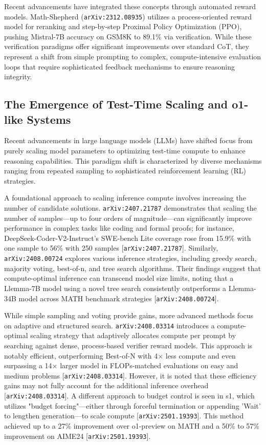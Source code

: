 \documentclass[11pt]{article}
\begin{document}
Recent advancements have integrated these concepts through automated reward models. Math-Shepherd (\texttt{arXiv:2312.08935}) utilizes a process-oriented reward model for reranking and step-by-step Proximal Policy Optimization (PPO), pushing Mistral-7B accuracy on GSM8K to 89.1\% via verification. While these verification paradigms offer significant improvements over standard CoT, they represent a shift from simple prompting to complex, compute-intensive evaluation loops that require sophisticated feedback mechanisms to ensure reasoning integrity.

\subsection{The Emergence of Test-Time Scaling and o1-like Systems}

Recent advancements in large language models (LLMs) have shifted focus from purely scaling model parameters to optimizing test-time compute to enhance reasoning capabilities. This paradigm shift is characterized by diverse mechanisms ranging from repeated sampling to sophisticated reinforcement learning (RL) strategies.

A foundational approach to scaling inference compute involves increasing the number of candidate solutions. \texttt{arXiv:2407.21787} demonstrates that scaling the number of samples—up to four orders of magnitude—can significantly improve performance in complex tasks like coding and formal proofs; for instance, DeepSeek-Coder-V2-Instruct's SWE-bench Lite coverage rose from 15.9\% with one sample to 56\% with 250 samples [\texttt{arXiv:2407.21787}]. Similarly, \texttt{arXiv:2408.00724} explores various inference strategies, including greedy search, majority voting, best-of-n, and tree search algorithms. Their findings suggest that compute-optimal inference can transcend model size limits, noting that a Llemma-7B model using a novel tree search consistently outperforms a Llemma-34B model across MATH benchmark strategies [\texttt{arXiv:2408.00724}].

While simple sampling and voting provide gains, more advanced methods focus on adaptive and structured search. \texttt{arXiv:2408.03314} introduces a compute-optimal scaling strategy that adaptively allocates compute per prompt by searching against dense, process-based verifier reward models. This approach is notably efficient, outperforming Best-of-N with 4× less compute and even surpassing a 14× larger model in FLOPs-matched evaluations on easy and medium problems [\texttt{arXiv:2408.03314}]. However, it is noted that these efficiency gains may not fully account for the additional inference overhead [\texttt{arXiv:2408.03314}]. A different approach to budget control is seen in s1, which utilizes "budget forcing"—either through forceful termination or appending 'Wait' to lengthen generation—to scale compute [\texttt{arXiv:2501.19393}]. This method achieved up to a 27\% improvement over o1-preview on MATH and a 50\% to 57\% improvement on AIME24 [\texttt{arXiv:2501.19393}].
\end{document}
